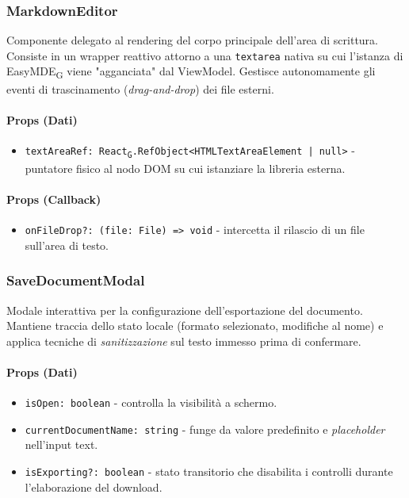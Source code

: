 \documentclass[11pt,a4paper]{article}
\newcommand{\gls}[1]{#1\textsubscript{G}}
\begin{document}
\subsubsection{MarkdownEditor}
Componente delegato al rendering del corpo principale dell'area di scrittura. Consiste in un wrapper reattivo attorno a una \texttt{textarea} nativa su cui l'istanza di \gls{EasyMDE} viene "agganciata" dal ViewModel. Gestisce autonomamente gli eventi di trascinamento (\textit{drag-and-drop}) dei file esterni.

\paragraph{Props (Dati)}
\begin{itemize}
    \item \texttt{textAreaRef: \gls{React}.RefObject<HTMLTextAreaElement | null>} - puntatore fisico al nodo DOM su cui istanziare la libreria esterna.
\end{itemize}

\paragraph{Props (Callback)}
\begin{itemize}
    \item \texttt{onFileDrop?: (file: File) => void} - intercetta il rilascio di un file sull'area di testo.
\end{itemize}


\subsubsection{SaveDocumentModal}
Modale interattiva per la configurazione dell'esportazione del documento. Mantiene traccia dello stato locale (formato selezionato, modifiche al nome) e applica tecniche di \textit{sanitizzazione} sul testo immesso prima di confermare.

\paragraph{Props (Dati)}
\begin{itemize}
    \item \texttt{isOpen: boolean} - controlla la visibilità a schermo.
    \item \texttt{currentDocumentName: string} - funge da valore predefinito e \textit{placeholder} nell'input text.
    \item \texttt{isExporting?: boolean} - stato transitorio che disabilita i controlli durante l'elaborazione del download.
\end{itemize}
\end{document}
